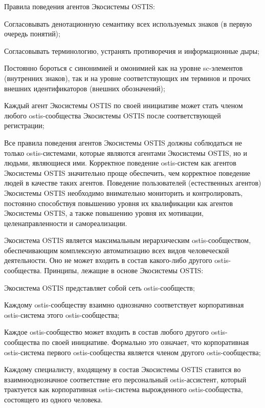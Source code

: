 Правила поведения агентов Экосистемы OSTIS:
\begin{textitemize}
    \item Согласовывать денотационную семантику всех используемых знаков (в первую очередь понятий);
    \item Согласовывать терминологию, устранять противоречия и информационные дыры;
    \item Постоянно бороться с синонимией и омонимией как на уровне sc-элементов (внутренних знаков), так и на уровне соответствующих им терминов и прочих внешних идентификаторов (внешних обозначений);
    \item Каждый агент Экосистемы OSTIS по своей инициативе может стать членом любого ostis-сообщества Экосистемы OSTIS после соответствующей регистрации;
\end{textitemize}

Все правила поведения агентов Экосистемы OSTIS должны соблюдаться не только ostis-системами, которые являются агентами Экосистемы OSTIS, но и людьми, являющиеся ими. 
Корректное поведение ostis-систем как агентов Экосистемы OSTIS значительно проще обеспечить, чем корректное поведение людей в качестве таких агентов. 
Поведение пользователей (естественных агентов) Экосистемы OSTIS необходимо внимательно мониторить и контролировать, постоянно способствуя повышению уровня их квалификации как агентов Экосистемы OSTIS, а также повышению уровня их мотивации, целенаправленности и самореализации.

Экосистема OSTIS является максимальным иерархическим ostis-сообществом, обеспечивающим комплексную автоматизацию всех видов человеческой деятельности. 
Оно не может входить в состав какого-либо другого ostis-сообщества. 
Принципы, лежащие в основе Экосистемы OSTIS:
\begin{textitemize}
    \item Экосистема OSTIS представляет собой сеть ostis-сообществ;
    \item Каждому ostis-сообществу взаимно однозначно соответствует корпоративная ostis-система этого ostis-сообщества;
    \item Каждое ostis-сообщество может входить в состав любого другого ostis-сообщества по своей инициативе. Формально это означает, что корпоративная ostis-система первого ostis-сообщества является членом другого ostis-сообщества;
    \item Каждому специалисту, входящему в состав Экосистемы OSTIS ставится во взаимнооднозначное соответствие его персональный ostis-ассистент, который трактуется как корпоративная ostis-система вырожденного ostis-сообщества, состоящего из одного человека.
\end{textitemize}

